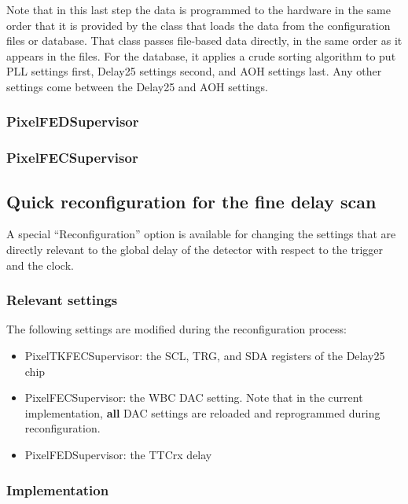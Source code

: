Note that in this last step the data is programmed to the hardware in
the same order that it is provided by the class that loads the data
from the configuration files or database. That class passes file-based
data directly, in the same order as it appears in the files. For the
database, it applies a crude sorting algorithm to put PLL settings
first, Delay25 settings second, and AOH settings last. Any other
settings come between the Delay25 and AOH settings.

\subsubsection{PixelFEDSupervisor}

\subsubsection{PixelFECSupervisor}



\subsection{Quick reconfiguration for the fine delay scan}

A special ``Reconfiguration'' option is available for changing the
settings that are directly relevant to the global delay of the
detector with respect to the trigger and the clock.

\subsubsection{Relevant settings}

The following settings are modified during the reconfiguration process:
\begin{itemize}
\item PixelTKFECSupervisor: the SCL, TRG, and SDA registers of the Delay25 chip
\item PixelFECSupervisor: the WBC DAC setting. Note that in the current implementation, {\bf all} DAC settings are reloaded and reprogrammed during reconfiguration.
\item PixelFEDSupervisor: the TTCrx delay
\end{itemize}

\subsubsection{Implementation}

